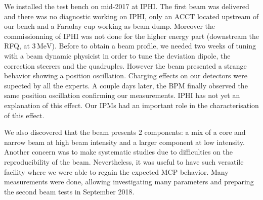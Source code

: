 We installed the test bench on mid-2017 at IPHI. The first beam was delivered and there was no diagnostic working on IPHI, only an ACCT located upstream of our bench and a Faraday cup working as beam dump. Moreover the commissionning of IPHI was not done for the higher energy part (downstream the RFQ, at $3\,\mathrm{MeV}$). Before to obtain a beam profile, we needed two weeks of tuning with a beam dynamic physicist in order to tune the deviation dipole, the correction steerers and the quadruples. However the beam presented a strange behavior showing a position oscillation. Charging effects on our detectors were supected by all the experts. A couple days later, the BPM finally observed the same position oscillation confirming our measurements. IPHI has not yet an explanation of this effect. Our IPMs had an important role in the characterisation of this effect.


We also discovered that the beam presents 2 components: a mix of a core and narrow beam at high beam intensity and a larger component at low intensity. Another concern was to make systematic studies due to difficulties on the reproducibility of the beam. Nevertheless, it was useful to have such versatile facility where we were able to regain the expected MCP behavior. Many measurements were done, allowing investigating many parameters and preparing the second beam tests in September 2018.

